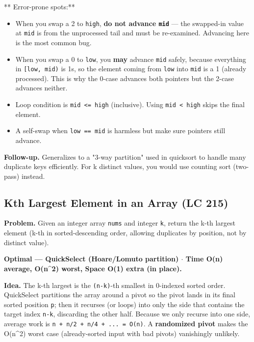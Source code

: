 \documentclass[11pt]{article}
\providecommand{\tightlist}{\setlength{\itemsep}{1pt}\setlength{\parskip}{0pt}}
\begin{document}
** Error-prone spots:**

\begin{itemize}
\tightlist
\item
  When you swap a 2 to \texttt{high}, \textbf{do not advance \texttt{mid}} --- the swapped-in value at \texttt{mid} is from the unprocessed tail and must be re-examined. Advancing here is the most common bug.
\item
  When you swap a 0 to \texttt{low}, you \textbf{may} advance \texttt{mid} safely, because everything in \texttt{{[}low,\ mid)} is 1s, so the element coming from \texttt{low} into \texttt{mid} is a 1 (already processed). This is why the 0-case advances both pointers but the 2-case advances neither.
\item
  Loop condition is \texttt{mid\ \textless{}=\ high} (inclusive). Using \texttt{mid\ \textless{}\ high} skips the final element.
\item
  A self-swap when \texttt{low\ ==\ mid} is harmless but make sure pointers still advance.
\end{itemize}

\textbf{Follow-up.} Generalizes to a "3-way partition" used in quicksort to handle many duplicate keys efficiently. For k distinct values, you would use counting sort (two-pass) instead.

\subsection{Kth Largest Element in an Array (LC 215)}\label{kth-largest-element-in-an-array-lc-215}

\textbf{Problem.} Given an integer array \texttt{nums} and integer \texttt{k}, return the k-th largest element (k-th in sorted-descending order, allowing duplicates by position, not by distinct value).

\textbf{Optimal --- QuickSelect (Hoare/Lomuto partition) \(\cdot\) Time O(n) average, O(n\^{}2) worst, Space O(1) extra (in place).}

\textbf{Idea.} The k-th largest is the \texttt{(n-k)}-th smallest in 0-indexed sorted order. QuickSelect partitions the array around a pivot so the pivot lands in its final sorted position \texttt{p}; then it recurses (or loops) into only the side that contains the target index \texttt{n-k}, discarding the other half. Because we only recurse into one side, average work is \texttt{n\ +\ n/2\ +\ n/4\ +\ ...\ =\ O(n)}. A \textbf{randomized pivot} makes the O(n\^{}2) worst case (already-sorted input with bad pivots) vanishingly unlikely.
\end{document}
